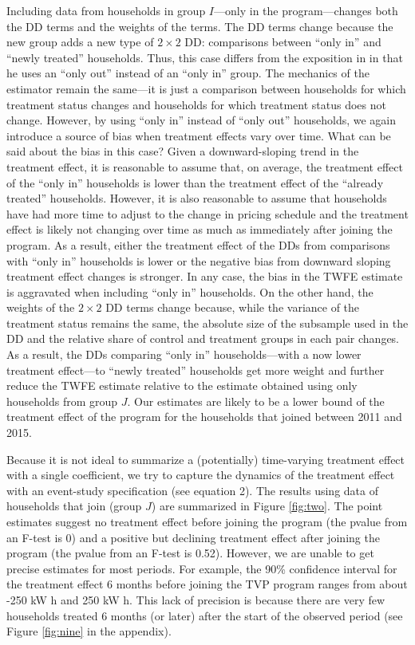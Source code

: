 \documentclass[12pt]{article}
\begin{document}
Including data from households in group $I$---only in the program---changes both the DD terms and the weights of the terms. The DD terms change because the new group adds a new type of $2 \times 2$ DD: comparisons between \enquote{only in} and \enquote{newly treated} households. Thus, this case differs from the exposition in \citet{goodman-baconDifferenceinDifferencesVariationTreatment2018} in that he uses an \enquote{only out} instead of an \enquote{only in} group. The mechanics of the estimator remain the same---it is just a comparison between households for which treatment status changes and households for which treatment status does not change. However, by using \enquote{only in} instead of \enquote{only out} households, we again introduce a source of bias when treatment effects vary over time. What can be said about the bias in this case? Given a downward-sloping trend in the treatment effect, it is reasonable to assume that, on average, the treatment effect of the \enquote{only in} households is lower than the treatment effect of the \enquote{already treated} households. However, it is also reasonable to assume that households have had more time to adjust to the change in pricing schedule and the treatment effect is likely not changing over time as much as immediately after joining the program. As a result, either the treatment effect of the DDs from comparisons with \enquote{only in} households is lower or the negative bias from downward sloping treatment effect changes is stronger. In any case, the bias in the TWFE estimate is aggravated when including \enquote{only in} households. On the other hand, the weights of the $2 \times 2$  DD terms change because, while the variance of the treatment status remains the same, the absolute size of the subsample used in the DD and the relative share of control and treatment groups in each pair changes. As a result, the DDs comparing \enquote{only in} households---with a now lower treatment effect---to \enquote{newly treated} households get more weight and further reduce the TWFE estimate relative to the estimate obtained using only households from group $J$. Our estimates are likely to be a lower bound of the treatment effect of the program for the households that joined between 2011 and 2015.

Because it is not ideal to summarize a (potentially) time-varying treatment effect with a single coefficient, we try to capture the dynamics of the treatment effect with an event-study specification (see equation 2). The results using data of households that join (group $J$) are summarized in Figure \ref{fig:two}. The point estimates suggest no treatment effect before joining the program (the pvalue from an F-test is 0) and a positive but declining treatment effect after joining the program (the pvalue from an F-test is 0.52). However, we are unable to get precise estimates for most periods. For example, the 90\% confidence interval for the treatment effect 6 months before joining the TVP program ranges from about -250 kW h and 250 kW h. This lack of precision is because there are very few households treated 6 months (or later) after the start of the observed period (see Figure \ref{fig:nine} in the appendix).
\end{document}
